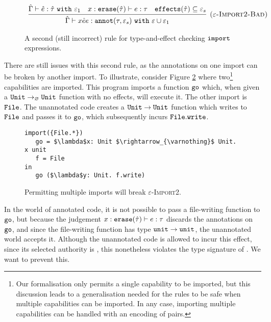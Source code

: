 \begin{figure}
\vspace*{-2mm}
\[
\begin{array}{c}
\infer[\textsc{($\varepsilon$-Import2-Bad)}]
	{ \hat \Gamma \vdash {x}{\hat e}{e}: \kwa{annot}(\tau, \varepsilon_s)~\kw{with} \varepsilon \cup \varepsilon_1 }
	{ \hat \Gamma \vdash \hat e: \hat \tau~\kw{with} \varepsilon_1 & x: \kwa{erase}(\hat \tau) \vdash e: \tau & \kwa{effects}(\hat \tau) \subseteq \varepsilon_s}

\end{array}
\]
\vspace*{-5mm}
\caption{A second (still incorrect) rule for type-and-effect checking $\mathtt{import}$ expressions.}
\vspace*{-5mm}
\label{fig:import_rule_2}
\end{figure}

There are still issues with this second rule, as the annotations on one import
can be broken by another import. To illustrate, consider Figure
\ref{fig:rule_import2_counterexample}
where two\footnote{Our formalisation only permits a single capability
  to be imported, but this discussion leads to a generalisation needed
  for the rules to be safe when multiple capabilities can be imported.
  In any case, importing multiple capabilities can be handled with an
  encoding of pairs.} capabilities are imported. This program imports
a function $\mathtt{go}$ which, when given a
$\mathtt{Unit} \rightarrow_{\varnothing} \mathtt{Unit}$ function with no effects, will
execute it. The other import is $\mathtt{File}$. The unannotated code
creates a $\mathtt{Unit} \rightarrow \mathtt{Unit}$ function which writes to
$\mathtt{File}$ and passes it to $\mathtt{go}$, which subsequently incurs
$\mathtt{File.write}$.

\begin{figure}[h]
\vspace*{-5mm}
\begin{lstlisting}
import({File.*})
   go = $\lambda$x: Unit $\rightarrow_{\varnothing}$ Unit. x unit
   f = File
in
   go ($\lambda$y: Unit. f.write)
\end{lstlisting}
\vspace*{-5mm}
\caption{Permitting multiple imports will break \textsc{$\varepsilon$-Import2}.}
\vspace*{-5mm}
\label{fig:rule_import2_counterexample}
\end{figure}

In the world of annotated code, it is not possible to pass a
file-writing function to $\mathtt{go}$, but because the judgement
$x: \mathtt{erase}(\hat \tau) \vdash e: \tau$ discards the annotations on
$\mathtt{go}$, and since the file-writing function has type
$\mathtt{unit} \rightarrow \mathtt{unit}$, the unannotated world accepts it.
Although the unannotated code is allowed to incur this effect, since
its selected authority is , this nonetheless violates the type signature of . We want to prevent this.

